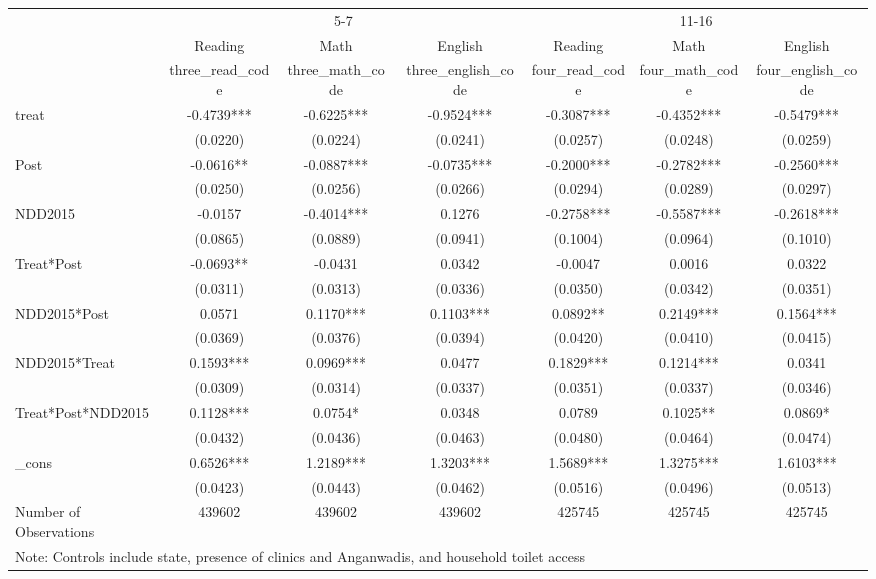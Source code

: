 {
\def\sym#1{\ifmmode^{#1}\else\(^{#1}\)\fi}
\begin{tabular}{l*{6}{c}}
\hline\hline
            &\multicolumn{3}{c}{5-7}&\multicolumn{3}{c}{11-16}\\\cmidrule(lr){2-4}\cmidrule(lr){5-7}
            &\multicolumn{1}{c}{Reading}&\multicolumn{1}{c}{Math}&\multicolumn{1}{c}{English}&\multicolumn{1}{c}{Reading}&\multicolumn{1}{c}{Math}&\multicolumn{1}{c}{English}\\
            &three\_read\_code   &three\_math\_code   &three\_english\_code   &four\_read\_code   &four\_math\_code   &four\_english\_code   \\
\hline
treat       &-0.4739***&-0.6225***&-0.9524***&-0.3087***&-0.4352***&-0.5479***\\
            &(0.0220)   &(0.0224)   &(0.0241)   &(0.0257)   &(0.0248)   &(0.0259)   \\
[1em]
Post        &-0.0616** &-0.0887***&-0.0735***&-0.2000***&-0.2782***&-0.2560***\\
            &(0.0250)   &(0.0256)   &(0.0266)   &(0.0294)   &(0.0289)   &(0.0297)   \\
[1em]
NDD2015     &-0.0157   &-0.4014***&0.1276   &-0.2758***&-0.5587***&-0.2618***\\
            &(0.0865)   &(0.0889)   &(0.0941)   &(0.1004)   &(0.0964)   &(0.1010)   \\
[1em]
Treat*Post  &-0.0693** &-0.0431   &0.0342   &-0.0047   &0.0016   &0.0322   \\
            &(0.0311)   &(0.0313)   &(0.0336)   &(0.0350)   &(0.0342)   &(0.0351)   \\
[1em]
NDD2015*Post&0.0571   &0.1170***&0.1103***&0.0892** &0.2149***&0.1564***\\
            &(0.0369)   &(0.0376)   &(0.0394)   &(0.0420)   &(0.0410)   &(0.0415)   \\
[1em]
NDD2015*Treat&0.1593***&0.0969***&0.0477   &0.1829***&0.1214***&0.0341   \\
            &(0.0309)   &(0.0314)   &(0.0337)   &(0.0351)   &(0.0337)   &(0.0346)   \\
[1em]
Treat*Post*NDD2015&0.1128***&0.0754*  &0.0348   &0.0789   &0.1025** &0.0869*  \\
            &(0.0432)   &(0.0436)   &(0.0463)   &(0.0480)   &(0.0464)   &(0.0474)   \\
[1em]
\_cons      &0.6526***&1.2189***&1.3203***&1.5689***&1.3275***&1.6103***\\
            &(0.0423)   &(0.0443)   &(0.0462)   &(0.0516)   &(0.0496)   &(0.0513)   \\
\hline
Number of Observations&439602   &439602   &439602   &425745   &425745   &425745   \\
\hline\hline
\multicolumn{7}{l}{\footnotesize Note: Controls include state, presence of clinics and Anganwadis, and household toilet access}\\
\end{tabular}
}
